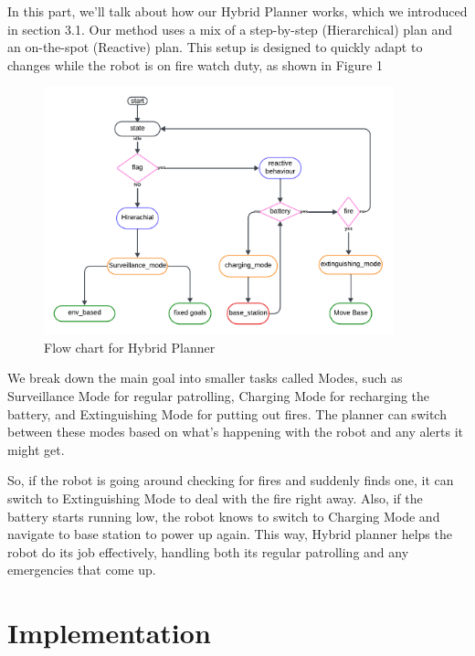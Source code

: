 In this part, we'll talk about how our Hybrid Planner works, which we introduced in section 3.1. Our method uses a mix of a step-by-step (Hierarchical) plan and an on-the-spot (Reactive) plan. This setup is designed to quickly adapt to changes while the robot is on fire watch duty, as shown in Figure 1

\label{sec:Approach}
\begin{figure}[h]
  \centering
  \includegraphics[width=0.9\textwidth, height=0.5\textheight]{Bilder/flow_chart.png}
  \caption{Flow chart for Hybrid Planner}
  \label{fig:flowchart}
\end{figure}

We break down the main goal into smaller tasks called Modes, such as Surveillance Mode for regular patrolling, Charging Mode for recharging the battery, and Extinguishing Mode for putting out fires. The planner can switch between these modes based on what's happening with the robot and any alerts it might get.

So, if the robot is going around checking for fires and suddenly finds one, it can switch to Extinguishing Mode to deal with the fire right away. Also, if the battery starts running low, the robot knows to switch to Charging Mode and navigate to base station to power up again. This way, Hybrid planner helps the robot do its job effectively, handling both its regular patrolling and any emergencies that come up.

\section{Implementation}



